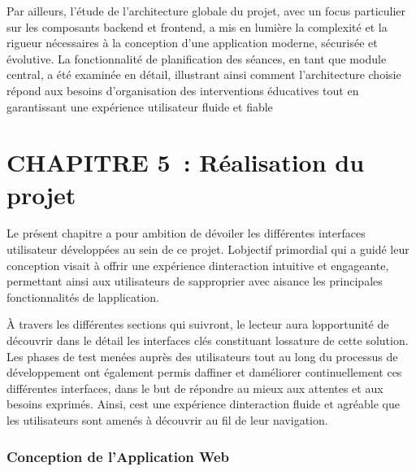 \documentclass[12pt,a4paper,twoside,openright]{report}
\begin{document}
Par ailleurs, l'étude de l'architecture globale du projet, avec un focus
particulier sur les composants backend et frontend, a mis en lumière la
complexité et la rigueur nécessaires à la conception d'une application
moderne, sécurisée et évolutive. La fonctionnalité de planification des
séances, en tant que module central, a été examinée en détail,
illustrant ainsi comment l'architecture choisie répond aux besoins
d'organisation des interventions éducatives tout en garantissant une
expérience utilisateur fluide et fiable

\hypertarget{section-7}{%
\section{}\label{section-7}}

\hypertarget{chapitre-5-ruxe9alisation-du-projet}{%
\section{CHAPITRE 5~: Réalisation du
projet}\label{chapitre-5-ruxe9alisation-du-projet}}

Le présent chapitre a pour ambition de dévoiler les différentes
interfaces utilisateur développées au sein de ce projet.
L\textquotesingle objectif primordial qui a guidé leur conception visait
à offrir une expérience d\textquotesingle interaction intuitive et
engageante, permettant ainsi aux utilisateurs de
s\textquotesingle approprier avec aisance les principales
fonctionnalités de l\textquotesingle application.

À travers les différentes sections qui suivront, le lecteur aura
l\textquotesingle opportunité de découvrir dans le détail les interfaces
clés constituant l\textquotesingle ossature de cette solution. Les
phases de test menées auprès des utilisateurs tout au long du processus
de développement ont également permis d\textquotesingle affiner et
d\textquotesingle améliorer continuellement ces différentes interfaces,
dans le but de répondre au mieux aux attentes et aux besoins exprimés.
Ainsi, c\textquotesingle est une expérience
d\textquotesingle interaction fluide et agréable que les utilisateurs
sont amenés à découvrir au fil de leur navigation.

\hypertarget{conception-de-lapplication-web}{%
\subsubsection{\texorpdfstring{\hfill\break
Conception de l'Application
Web}{ Conception de l'Application Web}}\label{conception-de-lapplication-web}}
\end{document}
